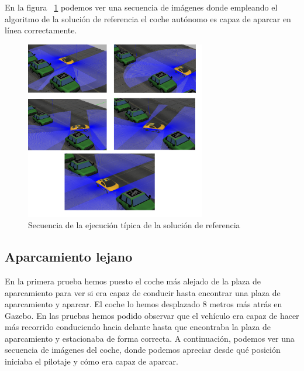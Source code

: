 En la figura ~\ref{fig.AparcamientoSecuencia} podemos ver una secuencia de imágenes donde empleando el algoritmo de la solución de referencia el coche autónomo es capaz de aparcar en línea correctamente.

\begin{figure}[H]
  \begin{center}
    \includegraphics[width=0.7\textwidth]{figures/Autopark/AparcamientoSecuencia.png}
		\caption{Secuencia de la ejecución típica de la solución de referencia}
		\label{fig.AparcamientoSecuencia}
		\end{center}
\end{figure}


\subsection{Aparcamiento lejano}

En la primera prueba hemos puesto el coche más alejado de la plaza de aparcamiento para ver si era capaz de conducir hasta encontrar una plaza de aparcamiento y aparcar. El coche lo hemos desplazado 8 metros más atrás en Gazebo. En las pruebas hemos podido observar que el vehículo era capaz de hacer más recorrido conduciendo hacia delante hasta que encontraba la plaza de aparcamiento y estacionaba de forma correcta. A continuación, podemos ver una secuencia de imágenes del coche, donde podemos apreciar desde qué posición iniciaba el pilotaje y cómo era capaz de aparcar.

